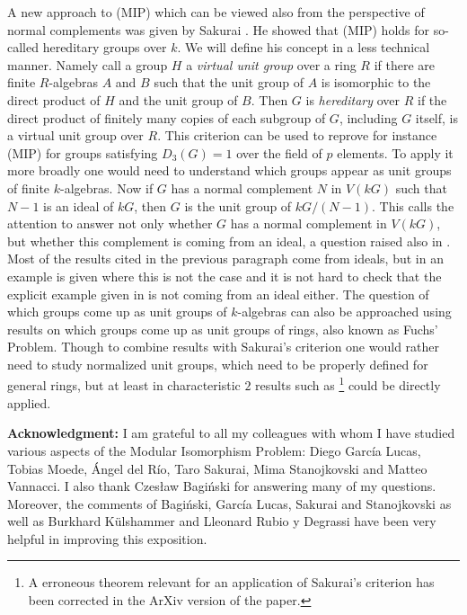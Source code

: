 \documentclass[11pt, a4paper]{amsart}
\theoremstyle{definition}
\begin{document}
A new approach to (MIP) which can be viewed also from the perspective of normal complements was given by Sakurai \cite{Sakurai}. He showed that (MIP) holds for so-called hereditary groups over $k$. We will define his concept in a less technical manner. Namely call a group $H$ a \emph{virtual unit group} over a ring $R$ if there are finite $R$-algebras $A$ and $B$ such that the unit group of $A$ is isomorphic to the direct product of $H$ and the unit group of $B$. Then $G$ is \emph{hereditary} over $R$ if the direct product of finitely many copies of each subgroup of $G$, including $G$ itself, is a virtual unit group over $R$. This criterion can be used to reprove for instance (MIP) for groups satisfying $D_3(G)=1$ over the field of $p$ elements. To apply it more broadly one would need to understand which groups appear as unit groups of finite $k$-algebras. Now if $G$ has a normal complement $N$ in $V(kG)$ such that $N-1$ is an ideal of $kG$, then $G$ is the unit group of $kG/(N-1)$. This calls the attention to answer not only whether $G$ has a normal complement in $V(kG)$, but whether this complement is coming from an ideal, a question raised also in \cite[Section 5]{Bovdi98}. Most of the results cited in the previous paragraph come from ideals, but  in \cite[Section 4.3]{HertweckSoriano06} an example is given where this is not the case and it is not hard to check that the explicit example given in \cite{Hertweck07} is not coming from an ideal either. The question of which groups come up as unit groups of $k$-algebras can also be approached using results on which groups come up as unit groups of rings, also known as Fuchs' Problem. Though to combine results with Sakurai's criterion one would rather need to study normalized unit groups, which need to be properly defined for general rings, but at least in characteristic $2$ results such as \cite{SwartzWerner}\footnote{A erroneous theorem relevant for an application of Sakurai's criterion has been corrected in the ArXiv version of the paper.} could be directly applied. 

\vspace*{1cm}

\textbf{Acknowledgment:} I am grateful to all my colleagues with whom I have studied various aspects of the Modular Isomorphism Problem: Diego Garc\'ia Lucas, Tobias Moede, \'Angel del R\'io, Taro Sakurai, Mima Stanojkovski and Matteo Vannacci. I also thank Czes\l{}aw Bagi\'nski for answering many of my questions. Moreover, the comments of Bagi\'nski, Garc\'ia Lucas, Sakurai and Stanojkovski as well as Burkhard K\"ulshammer and Lleonard Rubio y Degrassi have been very helpful in improving this exposition.



\end{document}
